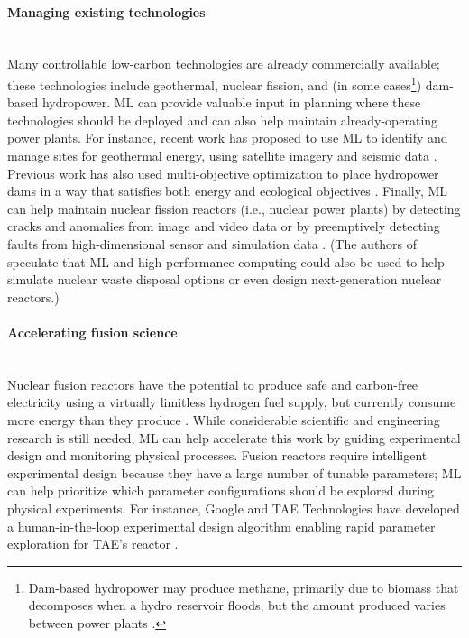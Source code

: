 \documentclass[11pt]{report}
\newcommand{\Gap}{\texorpdfstring{\hfill}{}}
\newcommand{\Rec}{\texorpdfstring{{\small\emph{\color{blue}{\fbox{High Leverage}}}}}{}}
\newcommand{\Longterm}{\texorpdfstring{{\small\emph{\color{OliveGreen}{\fbox{Long-term}}}}}{}}
\begin{document}
\paragraph{Managing existing technologies}
\mbox{}\\ 
Many controllable low-carbon technologies are already commercially available; these technologies include geothermal, nuclear fission, and (in some cases\footnote{Dam-based hydropower may produce methane, primarily due to biomass that decomposes when a hydro reservoir floods, but the amount produced varies between power plants \cite{steinhurst2012hydropower}.}) dam-based hydropower. 
ML can provide valuable input in planning where these technologies should be deployed and can also help maintain already-operating power plants.
For instance, recent work has proposed to use ML to identify and manage sites for geothermal energy, using satellite imagery and seismic data \cite{eere2019geothermal}.
Previous work has also used multi-objective optimization to place hydropower dams in a way that satisfies both energy and ecological objectives \cite{wu2018efficiently}.
Finally, ML can help maintain nuclear fission reactors (i.e., nuclear power plants) by detecting cracks and anomalies from image and video data \cite{chen2018nb} or by preemptively detecting faults from high-dimensional sensor and simulation data \cite{caliva2018deep}. (The authors of \cite{touran2017computational} speculate that ML and high performance computing could also be used to help simulate nuclear waste disposal options or even design next-generation nuclear reactors.)

\paragraph{Accelerating fusion science}\Gap
\textbf{\Rec\Longterm}\mbox{}\\
Nuclear fusion reactors \cite{nature2016nuclear} have the potential to produce safe and carbon-free electricity using a virtually limitless hydrogen fuel supply, but currently consume more energy than they produce \cite{cowley2016quest}. While considerable scientific and engineering research is still needed, ML can help accelerate this work by guiding experimental design and monitoring physical processes. Fusion reactors require intelligent experimental design because they have a large number of tunable parameters; ML can help prioritize which parameter configurations should be explored during physical experiments. For instance, Google and TAE Technologies have developed a human-in-the-loop experimental design algorithm enabling rapid parameter exploration for TAE's reactor \cite{baltz2017achievement}.
\end{document}
